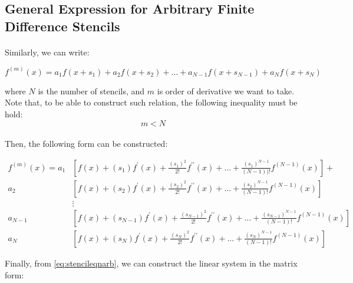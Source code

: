 \documentclass[letterpaper,12pt]{article}
\begin{document}
\subsection{General Expression for Arbitrary Finite Difference Stencils}
\label{sec:arbitstencil}
\paragraph{}Similarly, we can write:


\begin{equation}
    \label{eq:generalformarb}
    f^{(m)}(x) = a_1f(x+s_1) + a_2f(x+s_2) + \dots +  a_{N-1}f(x+s_{N-1}) + a_{N}f(x+s_N)
\end{equation}

where $N$ is the number of stencils, and $m$ is order of derivative we want to take. Note that, to be able to construct such relation, the following inequality must be hold:
\begin{equation*}
    m<N
\end{equation*}

\paragraph{}Then, the following form can be constructed:

\begin{equation}
    \label{eq:stencileqnarb}
    \begin{split}    
f^{(m)}(x)  = a_{1}&\left[ f(x) + (s_1)f^\prime(x) + \frac{(s_1)^2}{2!}f^{\prime\prime}(x) + \dots+\frac{(s_1)^{N-1}}{(N-1))!}f^{(N-1)}(x) \right] + \\
 a_{2}&\left[ f(x) + (s_2)f^\prime(x) + \frac{(s_2)^2}{2!}f^{\prime\prime}(x) +\dots+\frac{(s_2)^{N-1}}{(N-1)!}f^{(N-1)}(x) \right]\\
 &\vdots\\
 a_{N-1}&\left[ f(x) + (s_{N-1})f^\prime(x) + \frac{(s_{N-1})^2}{2!}f^{\prime\prime}(x) +\dots+\frac{(s_{N-1})^{N-1}}{(N-1)!}f^{(N-1)}(x) \right]\\
 a_{N}&\left[ f(x) + (s_N)f^\prime(x) + \frac{(s_N)^2}{2!}f^{\prime\prime}(x) + \dots+\frac{(s_N)^{N-1}}{(N-1)!}f^{(N-1)}(x) \right] 
\end{split}
\end{equation}

Finally, from \eqref{eq:stencileqnarb}, we can construct the linear system in the matrix form:
\end{document}
